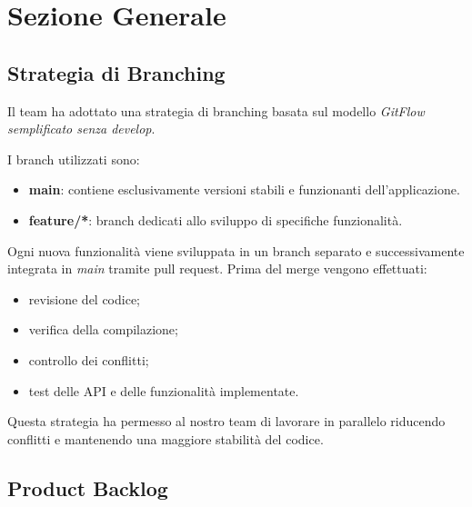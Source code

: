 \documentclass[12pt,a4paper]{article}
\begin{document}
\section{Sezione Generale}

\subsection{Strategia di Branching}

Il team ha adottato una strategia di branching basata sul modello \textit{GitFlow semplificato senza develop}.

I branch utilizzati sono:

\begin{itemize}
    \item \textbf{main}: contiene esclusivamente versioni stabili e funzionanti dell'applicazione.
    \item \textbf{feature/*}: branch dedicati allo sviluppo di specifiche funzionalità.
\end{itemize}

Ogni nuova funzionalità viene sviluppata in un branch separato e successivamente integrata in \textit{main} tramite pull request.
Prima del merge vengono effettuati:

\begin{itemize}
    \item revisione del codice;
    \item verifica della compilazione;
    \item controllo dei conflitti;
    \item test delle API e delle funzionalità implementate.
\end{itemize}

Questa strategia ha permesso al nostro team di lavorare in parallelo riducendo conflitti e mantenendo una maggiore stabilità del codice.

\subsection{Product Backlog}

\small
\end{document}
